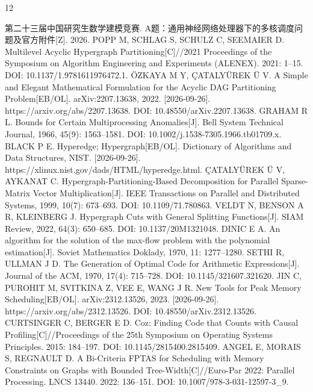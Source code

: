 \documentclass[anonymous,notoc]{gmcm2026}
\begin{document}
\FloatBarrier
\clearpage\begin{thebibliography}{12}
\raggedright
{} 第二十三届中国研究生数学建模竞赛. A题：通用神经网络处理器下的多核调度问题及官方附件{[}Z{]}. 2026.
 POPP M, SCHLAG S, SCHULZ C, SEEMAIER D. Multilevel Acyclic Hypergraph Partitioning{[}C{]}//2021 Proceedings of the Symposium on Algorithm Engineering and Experiments (ALENEX). 2021: 1--15. DOI: 10.1137/1.9781611976472.1.
 ÖZKAYA M Y, ÇATALYÜREK Ü V. A Simple and Elegant Mathematical Formulation for the Acyclic DAG Partitioning Problem{[}EB/OL{]}. arXiv:2207.13638, 2022. {[}2026-09-26{]}. https://arxiv.org/abs/2207.13638. DOI: 10.48550/arXiv.2207.13638.
 GRAHAM R L. Bounds for Certain Multiprocessing Anomalies{[}J{]}. Bell System Technical Journal, 1966, 45(9): 1563--1581. DOI: 10.1002/j.1538-7305.1966.tb01709.x.
 BLACK P E. Hyperedge; Hypergraph{[}EB/OL{]}. Dictionary of Algorithms and Data Structures, NIST. {[}2026-09-26{]}. https://xlinux.nist.gov/dads/HTML/hyperedge.html.
 ÇATALYÜREK Ü V, AYKANAT C. Hypergraph-Partitioning-Based Decomposition for Parallel Sparse-Matrix Vector Multiplication{[}J{]}. IEEE Transactions on Parallel and Distributed Systems, 1999, 10(7): 673--693. DOI: 10.1109/71.780863.
 VELDT N, BENSON A R, KLEINBERG J. Hypergraph Cuts with General Splitting Functions{[}J{]}. SIAM Review, 2022, 64(3): 650--685. DOI: 10.1137/20M1321048.
 DINIC E A. An algorithm for the solution of the max-flow problem with the polynomial estimation{[}J{]}. Soviet Mathematics Doklady, 1970, 11: 1277--1280.
 SETHI R, ULLMAN J D. The Generation of Optimal Code for Arithmetic Expressions{[}J{]}. Journal of the ACM, 1970, 17(4): 715--728. DOI: 10.1145/321607.321620.
 JIN C, PUROHIT M, SVITKINA Z, VEE E, WANG J R. New Tools for Peak Memory Scheduling{[}EB/OL{]}. arXiv:2312.13526, 2023. {[}2026-09-26{]}. https://arxiv.org/abs/2312.13526. DOI: 10.48550/arXiv.2312.13526.
 CURTSINGER C, BERGER E D. Coz: Finding Code that Counts with Causal Profiling{[}C{]}//Proceedings of the 25th Symposium on Operating Systems Principles. 2015: 184--197. DOI: 10.1145/2815400.2815409.
 ANGEL E, MORAIS S, REGNAULT D. A Bi-Criteria FPTAS for Scheduling with Memory Constraints on Graphs with Bounded Tree-Width{[}C{]}//Euro-Par 2022: Parallel Processing. LNCS 13440. 2022: 136--151. DOI: 10.1007/978-3-031-12597-3\_9.
\end{thebibliography}
\end{document}
